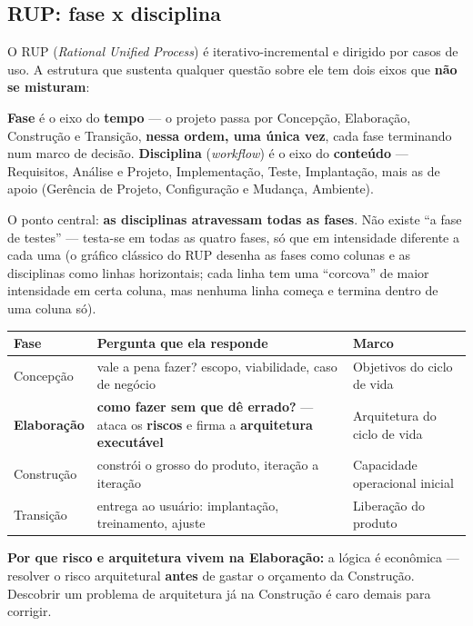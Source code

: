 \subsection{RUP: fase x disciplina}

\begin{conceito}
O RUP (\textit{Rational Unified Process}) é iterativo-incremental e dirigido
por casos de uso. A estrutura que sustenta qualquer questão sobre ele tem
dois eixos que \textbf{não se misturam}:

\textbf{Fase} é o eixo do \textbf{tempo} --- o projeto passa por Concepção,
Elaboração, Construção e Transição, \textbf{nessa ordem, uma única vez},
cada fase terminando num marco de decisão. \textbf{Disciplina}
(\textit{workflow}) é o eixo do \textbf{conteúdo} --- Requisitos, Análise e
Projeto, Implementação, Teste, Implantação, mais as de apoio (Gerência de
Projeto, Configuração e Mudança, Ambiente).

O ponto central: \textbf{as disciplinas atravessam todas as fases}. Não
existe “a fase de testes” --- testa-se em todas as quatro fases, só que em
intensidade diferente a cada uma (o gráfico clássico do RUP desenha as
fases como colunas e as disciplinas como linhas horizontais; cada linha tem
uma “corcova” de maior intensidade em certa coluna, mas nenhuma linha
começa e termina dentro de uma coluna só).

\begin{center}
\begin{tabular}{@{}p{2.4cm}p{5.2cm}p{4.4cm}@{}}
\toprule
\textbf{Fase} & \textbf{Pergunta que ela responde} & \textbf{Marco} \\
\midrule
Concepção & vale a pena fazer? escopo, viabilidade, caso de negócio & Objetivos do ciclo de vida \\
\textbf{Elaboração} & \textbf{como fazer sem que dê errado?} --- ataca os \textbf{riscos} e firma a \textbf{arquitetura executável} & Arquitetura do ciclo de vida \\
Construção & constrói o grosso do produto, iteração a iteração & Capacidade operacional inicial \\
Transição & entrega ao usuário: implantação, treinamento, ajuste & Liberação do produto \\
\bottomrule
\end{tabular}
\end{center}

\textbf{Por que risco e arquitetura vivem na Elaboração:} a lógica é
econômica --- resolver o risco arquitetural \textbf{antes} de gastar o
orçamento da Construção. Descobrir um problema de arquitetura já na
Construção é caro demais para corrigir.
\end{conceito}

